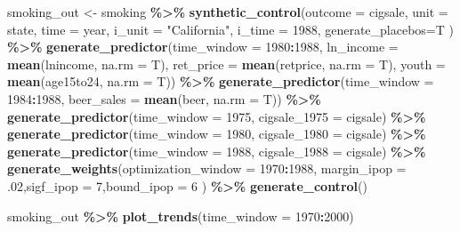 \documentclass[
]{article}
\newenvironment{Shaded}{\begin{snugshade}}{\end{snugshade}}
\newcommand{\AttributeTok}[1]{\textcolor[rgb]{0.13,0.29,0.53}{#1}}
\newcommand{\DecValTok}[1]{\textcolor[rgb]{0.00,0.00,0.81}{#1}}
\newcommand{\FunctionTok}[1]{\textcolor[rgb]{0.13,0.29,0.53}{\textbf{#1}}}
\newcommand{\NormalTok}[1]{#1}
\newcommand{\OtherTok}[1]{\textcolor[rgb]{0.56,0.35,0.01}{#1}}
\newcommand{\SpecialCharTok}[1]{\textcolor[rgb]{0.81,0.36,0.00}{\textbf{#1}}}
\newcommand{\StringTok}[1]{\textcolor[rgb]{0.31,0.60,0.02}{#1}}
\begin{document}
\begin{Shaded}
\begin{Highlighting}[]
\NormalTok{smoking\_out }\OtherTok{\textless{}{-}}
\NormalTok{  smoking }\SpecialCharTok{\%\textgreater{}\%}
  \FunctionTok{synthetic\_control}\NormalTok{(}\AttributeTok{outcome =}\NormalTok{ cigsale,}
                    \AttributeTok{unit =}\NormalTok{ state,}
                    \AttributeTok{time =}\NormalTok{ year,}
                    \AttributeTok{i\_unit =} \StringTok{"California"}\NormalTok{,}
                    \AttributeTok{i\_time =} \DecValTok{1988}\NormalTok{,}
                    \AttributeTok{generate\_placebos=}\NormalTok{T}
\NormalTok{                    ) }\SpecialCharTok{\%\textgreater{}\%}
  \FunctionTok{generate\_predictor}\NormalTok{(}\AttributeTok{time\_window =} \DecValTok{1980}\SpecialCharTok{:}\DecValTok{1988}\NormalTok{,}
                     \AttributeTok{ln\_income =} \FunctionTok{mean}\NormalTok{(lnincome, }\AttributeTok{na.rm =}\NormalTok{ T),}
                     \AttributeTok{ret\_price =} \FunctionTok{mean}\NormalTok{(retprice, }\AttributeTok{na.rm =}\NormalTok{ T),}
                     \AttributeTok{youth =} \FunctionTok{mean}\NormalTok{(age15to24, }\AttributeTok{na.rm =}\NormalTok{ T)) }\SpecialCharTok{\%\textgreater{}\%}
  \FunctionTok{generate\_predictor}\NormalTok{(}\AttributeTok{time\_window =} \DecValTok{1984}\SpecialCharTok{:}\DecValTok{1988}\NormalTok{,}
                     \AttributeTok{beer\_sales =} \FunctionTok{mean}\NormalTok{(beer, }\AttributeTok{na.rm =}\NormalTok{ T)) }\SpecialCharTok{\%\textgreater{}\%}
  \FunctionTok{generate\_predictor}\NormalTok{(}\AttributeTok{time\_window =} \DecValTok{1975}\NormalTok{,}
                     \AttributeTok{cigsale\_1975 =}\NormalTok{ cigsale) }\SpecialCharTok{\%\textgreater{}\%}
  \FunctionTok{generate\_predictor}\NormalTok{(}\AttributeTok{time\_window =} \DecValTok{1980}\NormalTok{,}
                     \AttributeTok{cigsale\_1980 =}\NormalTok{ cigsale) }\SpecialCharTok{\%\textgreater{}\%}
  \FunctionTok{generate\_predictor}\NormalTok{(}\AttributeTok{time\_window =} \DecValTok{1988}\NormalTok{,}
                     \AttributeTok{cigsale\_1988 =}\NormalTok{ cigsale) }\SpecialCharTok{\%\textgreater{}\%}
  \FunctionTok{generate\_weights}\NormalTok{(}\AttributeTok{optimization\_window =} \DecValTok{1970}\SpecialCharTok{:}\DecValTok{1988}\NormalTok{,}
                   \AttributeTok{margin\_ipop =}\NormalTok{ .}\DecValTok{02}\NormalTok{,}\AttributeTok{sigf\_ipop =} \DecValTok{7}\NormalTok{,}\AttributeTok{bound\_ipop =} \DecValTok{6}
\NormalTok{  ) }\SpecialCharTok{\%\textgreater{}\%}
  \FunctionTok{generate\_control}\NormalTok{()}

\NormalTok{smoking\_out }\SpecialCharTok{\%\textgreater{}\%} \FunctionTok{plot\_trends}\NormalTok{(}\AttributeTok{time\_window =} \DecValTok{1970}\SpecialCharTok{:}\DecValTok{2000}\NormalTok{)}
\end{Highlighting}
\end{Shaded}
\end{document}
